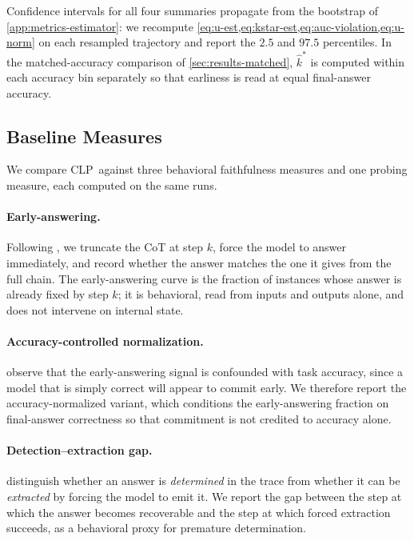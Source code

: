 \documentclass[11pt]{article}
\newcommand{\stepk}{k}
\newcommand{\CLP}{\textsc{CLP}}
\begin{document}
Confidence intervals for all four summaries propagate from the bootstrap of
\cref{app:metrics-estimator}: we recompute
\cref{eq:u-est,eq:kstar-est,eq:auc-violation,eq:u-norm} on each resampled
trajectory and report the $2.5$ and $97.5$ percentiles. In the
matched-accuracy comparison of \cref{sec:results-matched}, $\widehat{\stepk}^{*}$
is computed within each accuracy bin separately so that earliness is read at
equal final-answer accuracy.

\subsection{Baseline Measures}
\label{app:metrics-baselines}

We compare \CLP\ against three behavioral faithfulness measures and one
probing measure, each computed on the same runs.

\paragraph{Early-answering.} Following \citet{DBLP:journals/corr/abs-2307-13702},
we truncate the CoT at step $\stepk$, force the model to answer
immediately, and record whether the answer matches the one it gives from the
full chain. The early-answering curve is the fraction of instances whose answer
is already fixed by step $\stepk$; it is behavioral, read from inputs and
outputs alone, and does not intervene on internal state.

\paragraph{Accuracy-controlled normalization.} \citet{DBLP:journals/tmlr/BenthamSM24}
observe that the early-answering signal is confounded with task accuracy, since
a model that is simply correct will appear to commit early. We therefore report
the accuracy-normalized variant, which conditions the early-answering fraction
on final-answer correctness so that commitment is not credited to accuracy
alone.

\paragraph{Detection--extraction gap.} \citet{DBLP:journals/corr/abs-2604-06613}
distinguish whether an answer is \emph{determined} in the trace from whether it
can be \emph{extracted} by forcing the model to emit it. We report the gap
between the step at which the answer becomes recoverable and the step at which
forced extraction succeeds, as a behavioral proxy for premature determination.
\end{document}
